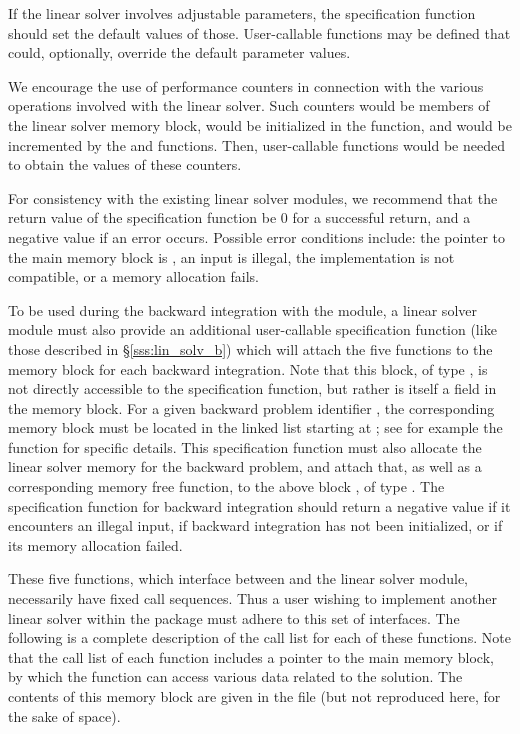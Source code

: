 If the linear solver involves adjustable parameters, the specification
function should set the default values of those.  User-callable
functions may be defined that could, optionally, override the default
parameter values.

We encourage the use of performance counters in connection with the various
operations involved with the linear solver.  Such counters would be
members of the linear solver memory block, would be initialized in the
 function, and would be incremented by the  and
 functions.  Then, user-callable functions would be needed to
obtain the values of these counters.

For consistency with the existing {\idas} linear solver modules, we
recommend that the return value of the specification function be 0 for
a successful return, and a negative value if an error occurs.
Possible error conditions include: the pointer to the main {\idas}
memory block is , an input is illegal, the {\nvector}
implementation is not compatible, or a memory allocation fails.

To be used during the backward integration with the {\idas} module,
a linear solver module must also provide an additional user-callable
specification function (like those described in \S\ref{sss:lin_solv_b})
which will attach the five functions to the {\idas} memory block for
each backward integration.
Note that this block, of type , is not directly accessible
to the specification function, but rather is itself a field in the
{\idas} memory block.  For a given backward problem identifier ,
the corresponding memory block must be located in the linked list starting
at ; see for example the function
 for specific details.
This specification function must also allocate the linear solver memory for
the backward problem, and attach that, as well as a corresponding memory free
function, to the above block , of type .
The specification function for backward integration should return a negative
value if it encounters an illegal input, if backward integration has
not been initialized, or if its memory allocation failed.

\vspace{0.1in}
These five functions, which interface between {\idas} and the linear solver module,
necessarily have fixed call sequences.  Thus a user wishing to implement another 
linear solver within the {\idas} package must adhere to this set of interfaces.
The following is a complete description of the call list for each of
these functions.  Note that the call list of each function includes a
pointer to the main {\idas} memory block, by which the function can access
various data related to the {\idas} solution.  The contents of this memory
block are given in the file  (but not reproduced here, for
the sake of space).

